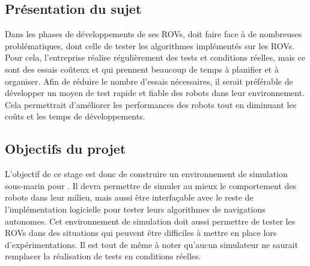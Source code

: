 		\subsection{Présentation du sujet}

			Dans les phases de développements de ses \gls{ROV}s, \forssea{} doit faire face à de nombreuses problématiques, dont celle de tester les algorithmes implémentés sur les \gls{ROV}s. Pour cela, l'entreprise réalise régulièrement des tests et conditions réelles, mais ce sont des essais coûteux et qui prennent beaucoup de temps à planifier et à organiser. Afin de réduire le nombre d'essais nécessaires, il serait préférable de développer un moyen de test rapide et fiable des robots dans leur environnement. Cela permettrait d'améliorer les performances des robots tout en diminuant les coûts et les temps de développements.

		\subsection{Objectifs du projet}

			L'objectif de ce stage est donc de construire un environnement de simulation sous-marin pour \forssea{}. Il devra permettre de simuler au mieux le comportement des robots dans leur milieu, mais aussi être interfaçable avec le reste de l'implémentation logicielle pour tester leurs algorithmes de navigations autonomes. Cet environnement de simulation doit aussi permettre de tester les \gls{ROV}s dans des situations qui peuvent être difficiles à mettre en place lors d'expérimentations. Il est tout de même à noter qu'aucun simulateur ne saurait remplacer la réalisation de tests en conditions réelles.

	